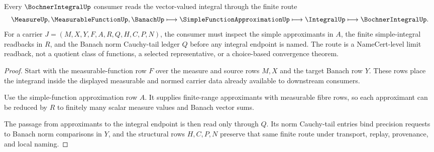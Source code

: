 \begin{theorem}
\label{thm:bochner-integral-simple-function-limit-route}
Every $\BochnerIntegralUp$ consumer reads the vector-valued integral through the finite route
$$
\MeasureUp,\MeasurableFunctionUp,\BanachUp\longmapsto \SimpleFunctionApproximationUp\longmapsto \IntegralUp\longmapsto \BochnerIntegralUp .
$$
For a carrier $J=(M,X,Y,F,A,R,Q,H,C,P,N)$, the consumer must inspect the simple approximants in $A$, the finite simple-integral readbacks in $R$, and the Banach norm Cauchy-tail ledger $Q$ before any integral endpoint is named. The route is a NameCert-level limit readback, not a quotient class of functions, a selected representative, or a choice-based convergence theorem.
\end{theorem}
\begin{proof}
Start with the measurable-function row $F$ over the measure and source rows $M,X$ and the target Banach row $Y$. These rows place the integrand inside the displayed measurable and normed carrier data already available to downstream consumers.

Use the simple-function approximation row $A$. It supplies finite-range approximants with measurable fibre rows, so each approximant can be reduced by $R$ to finitely many scalar measure values and Banach vector sums.

The passage from approximants to the integral endpoint is then read only through $Q$. Its norm Cauchy-tail entries bind precision requests to Banach norm comparisons in $Y$, and the structural rows $H,C,P,N$ preserve that same finite route under transport, replay, provenance, and local naming.
\end{proof}


\begin{closurestatus}{\BochnerIntegralUp}
  \theoryclosure{\seedClosure}
  \formalstatus{\unformalizedV}
\end{closurestatus}

